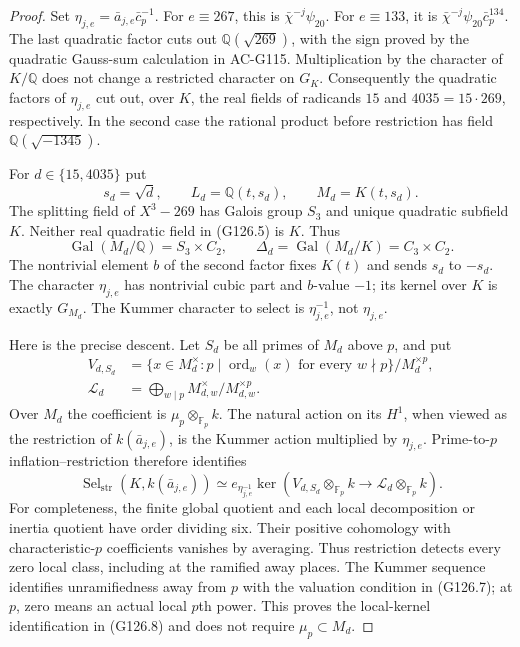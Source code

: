 \begin{proof}
Set \(\eta_{j,e}=\bar a_{j,e}\bar c_p^{-1}\).
For \(e\equiv267\), this is
\(\bar\chi^{-j}\psi_{20}\).  For \(e\equiv133\), it is
\(\bar\chi^{-j}\psi_{20}\bar c_p^{134}\).
The last quadratic factor cuts out \(\mathbb Q(\sqrt{269})\),
with the sign proved by the quadratic Gauss-sum calculation
in AC-G115.  Multiplication by the character of \(K/\mathbb Q\)
does not change a restricted character on \(G_K\).  Consequently
the quadratic factors of \(\eta_{j,e}\) cut out, over \(K\),
the real fields of radicands \(15\) and \(4035=15\cdot269\),
respectively.  In the second case the rational product before
restriction has field \(\mathbb Q(\sqrt{-1345})\).

For \(d\in\{15,4035\}\) put
\[
 s_d=\sqrt d,\qquad L_d=\mathbb Q(t,s_d),\qquad M_d=K(t,s_d).
 \tag{G126.5}
\]
The splitting field of \(X^3-269\) has Galois group \(S_3\)
and unique quadratic subfield \(K\).  Neither real quadratic
field in (G126.5) is \(K\).  Thus
\[
 \operatorname{Gal}(M_d/\mathbb Q)=S_3\times C_2,\qquad
 \Delta_d=\operatorname{Gal}(M_d/K)=C_3\times C_2.
 \tag{G126.6}
\]
The nontrivial element \(b\) of the second factor fixes \(K(t)\)
and sends \(s_d\) to \(-s_d\).  The character \(\eta_{j,e}\)
has nontrivial cubic part and \(b\)-value \(-1\); its kernel
over \(K\) is exactly \(G_{M_d}\).
The Kummer character to select is \(\eta_{j,e}^{-1}\), not
\(\eta_{j,e}\).

Here is the precise descent.  Let \(S_d\) be all primes of
\(M_d\) above \(p\), and put
\[
 \begin{split}
 V_{d,S_d}
  &=\{x\in M_d^\times:
       p\mid\operatorname{ord}_w(x)\text{ for every }w\nmid p\}
                                                 /M_d^{\times p},\\
 \mathcal L_d&=\bigoplus_{w\mid p}M_{d,w}^\times/M_{d,w}^{\times p}.
 \end{split}
 \tag{G126.7}
\]
Over \(M_d\) the coefficient is \(\mu_p\otimes_{\mathbb F_p}k\).
The natural action on its \(H^1\), when viewed as the
restriction of \(k(\bar a_{j,e})\), is the Kummer action
multiplied by \(\eta_{j,e}\).  Prime-to-\(p\)
inflation--restriction therefore identifies
\[
 \operatorname{Sel}_{\mathrm{str}}(K,k(\bar a_{j,e}))
   \simeq e_{\eta_{j,e}^{-1}}
       \ker\left(V_{d,S_d}\otimes_{\mathbb F_p}k
                       \longrightarrow\mathcal L_d\otimes_{\mathbb F_p}k\right).
 \tag{G126.8}
\]
For completeness, the finite global quotient and each local
decomposition or inertia quotient have order dividing six.
Their positive cohomology with characteristic-\(p\) coefficients
vanishes by averaging.  Thus restriction detects every zero
local class, including at the ramified away places.
The Kummer sequence identifies unramifiedness away from \(p\)
with the valuation condition in (G126.7); at \(p\), zero
means an actual local \(p\)th power.
This proves the local-kernel identification in (G126.8)
and does not require \(\mu_p\subset M_d\).


\end{proof}
